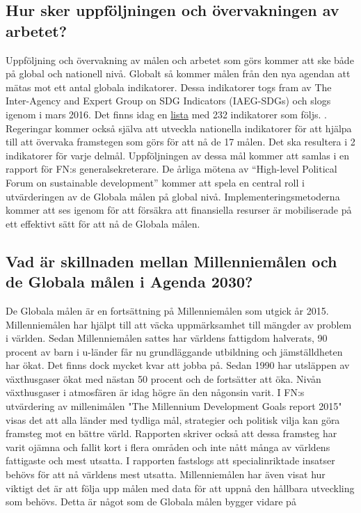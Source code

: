 \documentclass{report}
\begin{document}
\subsection{Hur sker uppföljningen och övervakningen av arbetet?} 
Uppföljning och övervakning av målen och arbetet som görs kommer att ske både på global och nationell nivå. Globalt så kommer målen från den nya agendan att mätas mot ett antal globala indikatorer. Dessa indikatorer togs fram av The Inter-Agency and Expert Group on SDG Indicators (IAEG-SDGs) och slogs igenom i mars 2016. \cite{web2030agenda}
Det finns idag en \href{https://unstats.un.org/sdgs/indicators/indicators-list/}{lista} med 232 indikatorer som följs. \cite{webUN2}.
Regeringar kommer också själva att utveckla nationella indikatorer för att hjälpa till att övervaka framstegen som görs för att nå de 17 målen. Det ska resultera i 2 indikatorer för varje delmål. Uppföljningen av dessa mål kommer att samlas i en rapport för FN:s generalsekreterare. De årliga mötena av  “High-level Political Forum on sustainable development” kommer att spela en central roll i utvärderingen av de Globala målen på global nivå. Implementeringsmetoderna kommer att ses igenom för att försäkra att finansiella resurser är mobiliserade på ett effektivt sätt för att nå de Globala målen.  \cite{web2030agenda}\\

\subsection{Vad är skillnaden mellan Millenniemålen och de Globala målen i Agenda 2030?} 
De Globala målen är en fortsättning på Millenniemålen som utgick år 2015. Millenniemålen har hjälpt till att väcka uppmärksamhet till mängder av problem i världen. Sedan Millenniemålen sattes har världens fattigdom halverats, 90 procent av barn i u-länder får nu grundläggande utbildning och jämställdheten har ökat. Det finns dock mycket kvar att jobba på. \cite{webEuropeanComission}
Sedan 1990 har utsläppen av växthusgaser ökat med nästan 50 procent och de fortsätter att öka. Nivån växthusgaser i atmosfären är idag högre än den någonsin varit. \cite{UN1}
I FN:s utvärdering av millenimålen "The Millennium Development Goals report 2015"  \cite{Millennium} visas det att alla länder med tydliga mål, strategier och politisk vilja kan göra framsteg mot en bättre värld. Rapporten skriver också att dessa framsteg har varit ojämna och fallit kort i flera områden och inte nått många av världens fattigaste och mest utsatta. I rapporten fastslogs att specialinriktade insatser behövs för att nå världens mest utsatta.  Millenniemålen har även visat hur viktigt det är att följa upp målen med data för att uppnå den hållbara utveckling som behövs. Detta är något som de Globala målen bygger vidare på \cite{Millennium}\\
\end{document}
